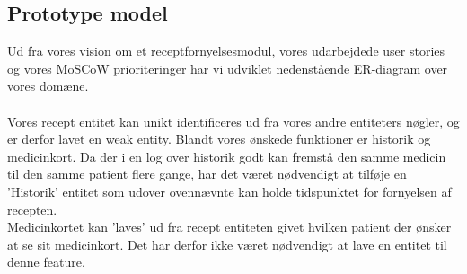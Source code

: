 \subsection{Prototype model}
Ud fra vores vision om et receptfornyelsesmodul, vores udarbejdede user stories og vores MoSCoW prioriteringer har vi udviklet nedenstående ER-diagram over vores domæne. 
\\
\\
Vores recept entitet kan unikt identificeres ud fra vores andre entiteters nøgler, og er derfor lavet en weak entity. Blandt vores ønskede funktioner er historik og medicinkort. Da der i en log over historik godt kan fremstå den samme medicin til den samme patient flere gange, har det været nødvendigt at tilføje en 'Historik' entitet som udover ovennævnte kan holde tidspunktet for fornyelsen af recepten.\\
Medicinkortet kan 'laves' ud fra recept entiteten givet hvilken patient der ønsker at se sit medicinkort. Det har derfor ikke været nødvendigt at lave en entitet til denne feature.\\

